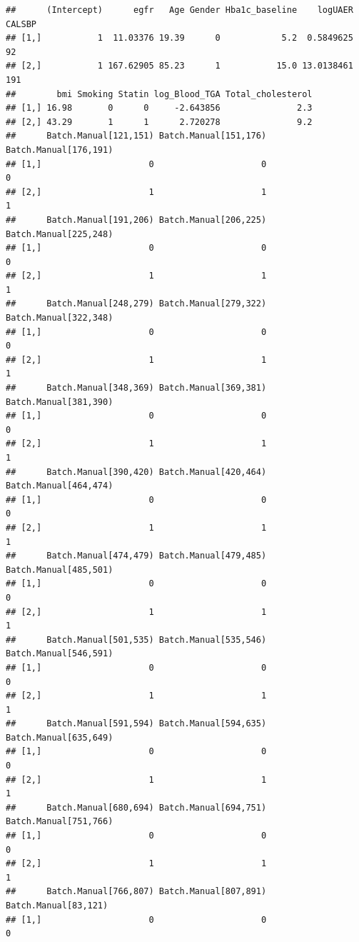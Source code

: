 \documentclass[]{article}
\begin{document}
\begin{verbatim}
##      (Intercept)      egfr   Age Gender Hba1c_baseline    logUAER CALSBP
## [1,]           1  11.03376 19.39      0            5.2  0.5849625     92
## [2,]           1 167.62905 85.23      1           15.0 13.0138461    191
##        bmi Smoking Statin log_Blood_TGA Total_cholesterol
## [1,] 16.98       0      0     -2.643856               2.3
## [2,] 43.29       1      1      2.720278               9.2
##      Batch.Manual[121,151) Batch.Manual[151,176) Batch.Manual[176,191)
## [1,]                     0                     0                     0
## [2,]                     1                     1                     1
##      Batch.Manual[191,206) Batch.Manual[206,225) Batch.Manual[225,248)
## [1,]                     0                     0                     0
## [2,]                     1                     1                     1
##      Batch.Manual[248,279) Batch.Manual[279,322) Batch.Manual[322,348)
## [1,]                     0                     0                     0
## [2,]                     1                     1                     1
##      Batch.Manual[348,369) Batch.Manual[369,381) Batch.Manual[381,390)
## [1,]                     0                     0                     0
## [2,]                     1                     1                     1
##      Batch.Manual[390,420) Batch.Manual[420,464) Batch.Manual[464,474)
## [1,]                     0                     0                     0
## [2,]                     1                     1                     1
##      Batch.Manual[474,479) Batch.Manual[479,485) Batch.Manual[485,501)
## [1,]                     0                     0                     0
## [2,]                     1                     1                     1
##      Batch.Manual[501,535) Batch.Manual[535,546) Batch.Manual[546,591)
## [1,]                     0                     0                     0
## [2,]                     1                     1                     1
##      Batch.Manual[591,594) Batch.Manual[594,635) Batch.Manual[635,649)
## [1,]                     0                     0                     0
## [2,]                     1                     1                     1
##      Batch.Manual[680,694) Batch.Manual[694,751) Batch.Manual[751,766)
## [1,]                     0                     0                     0
## [2,]                     1                     1                     1
##      Batch.Manual[766,807) Batch.Manual[807,891) Batch.Manual[83,121)
## [1,]                     0                     0                    0

\end{verbatim}
\end{document}

